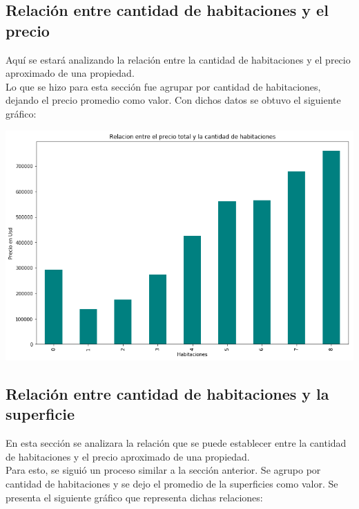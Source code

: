 \documentclass[a4paper, 10pt]{article}
\begin{document}
			\subsection{Relación entre cantidad de habitaciones y el precio}
				Aquí se estará analizando la relación entre la cantidad de habitaciones y el precio aproximado de una propiedad.
				\\
				Lo que se hizo para esta sección fue agrupar por cantidad de habitaciones, dejando el precio promedio como valor. Con dichos datos se obtuvo el siguiente gráfico:
				
				\begin{center}    		
    				\includegraphics[width=\textwidth]{images/RelHabPrec}    				
				\end{center}
				
			\subsection{Relación entre cantidad de habitaciones y la superficie}	
				En esta sección se analizara la relación que se puede establecer entre la cantidad de habitaciones y el precio aproximado de una propiedad.				
				\\
				Para esto, se siguió un proceso similar a la sección anterior. Se agrupo por cantidad de habitaciones y se dejo el promedio de la superficies como valor. Se presenta el siguiente gráfico que representa dichas relaciones:
				
\end{document}
